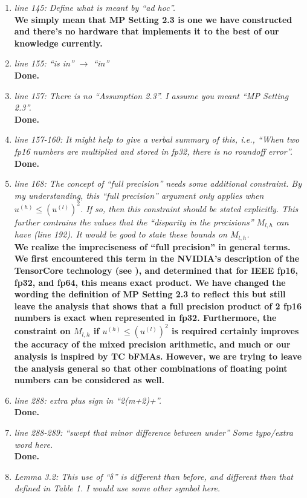 \documentclass[final,onefignum,onetabnum]{siamart190516}
\begin{document}
\begin{enumerate}
    {\bf Done.}
    \item {\it line 145: Define what is meant by ``ad hoc''. }\\
    {\bf We simply mean that MP Setting 2.3 is one we have constructed and there's no hardware that implements it to the best of our knowledge currently.}
    \item {\it line 155: ``is in'' $\rightarrow $ ``in'' }\\
    {\bf Done.}
    \item {\it line 157: There is no ``Assumption 2.3''. I assume you meant ``MP Setting 2.3''. }\\
    {\bf Done.}
    \item {\it line 157-160: It might help to give a verbal summary of this, i.e., ``When two fp16 numbers are multiplied and stored in fp32, there is no roundoff error''. }\\
    {\bf Done.}
    \item {\it line 168: The concept of ``full precision'' needs some additional constraint. By my understanding, this ``full precision'' argument only applies when $u^{(h)} \leq (u^{(l)})^2$. If so, then this constraint should be stated explicitly. This further contrains the values that the ``disparity in the precisions'' $M_{l,h}$ can have (line 192). It would be good to state these bounds on $M_{l,h}$. }\\
    {\bf We realize the impreciseness of ``full precision'' in general terms. We first encountered this term in the NVIDIA's description of the TensorCore technology (see \cite{Nvidia2017}), and determined that for IEEE fp16, fp32, and fp64, this means exact product. We have changed the wording the definition of MP Setting 2.3 to reflect this but still leave the analysis that shows that a full precision product of 2 fp16 numbers is exact when represented in fp32. Furthermore, the constraint on $M_{l,h}$ if $u^{(h)} \leq (u^{(l)})^2$ is required certainly improves the accuracy of the mixed precision arithmetic, and much or our analysis is inspired by TC bFMAs. However, we are trying to leave the analysis general so that other combinations of floating point numbers can be considered as well.}
    \item {\it line 288: extra plus sign in ``2(m+2)+''. }\\
    {\bf Done.}
    \item {\it line 288-289: ``swept that minor difference between under'' Some typo/extra word here. }\\
    {\bf Done.}
    \item {\it Lemma 3.2: This use of ``$\delta$'' is different than before, and different than that defined in Table 1. I would use some other symbol here. }\\

\end{enumerate}
\end{document}
